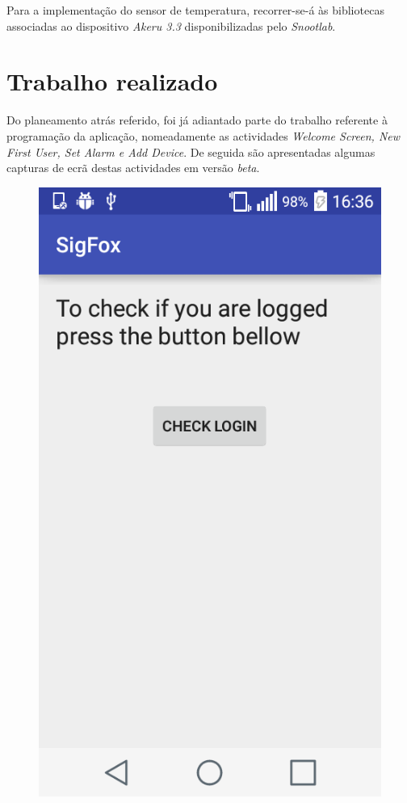 \documentclass[a4paper]{article}
\begin{document}
Para a implementação do sensor de temperatura, recorrer-se-á às bibliotecas associadas ao dispositivo \textit{Akeru 3.3} disponibilizadas pelo \textit{Snootlab}.

\section*{Trabalho realizado}

Do planeamento atrás referido, foi já adiantado parte do trabalho referente à programação da aplicação, nomeadamente as actividades \textit{Welcome Screen, New First User, Set Alarm e Add Device}. De seguida são apresentadas algumas capturas de ecrã destas actividades em versão \textit{beta}.

\begin{figure}[H]
  \includegraphics[width=\linewidth]{welcome.png}

\end{figure}
\end{document}
